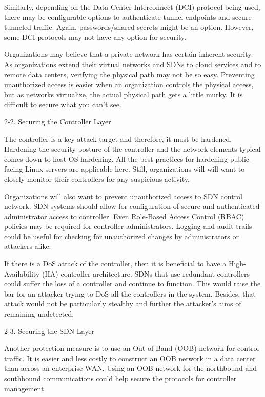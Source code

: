 Similarly, depending on the Data Center Interconnect (DCI) protocol being used, there may be configurable options to authenticate tunnel endpoints and secure tunneled traffic.  Again, passwords/shared-secrets might be an option.  However, some DCI protocols may not have any option for security.

Organizations may believe that a private network has certain inherent security.  As organizations extend their virtual networks and SDNs to cloud services and to remote data centers, verifying the physical path may not be so easy.  Preventing unauthorized access is easier when an organization controls the physical access, but as networks virtualize, the actual physical path gets a little murky.  It is difficult to secure what you can’t see.

2-2. Securing the Controller Layer

The controller is a key attack target and therefore, it must be hardened.  Hardening the security posture of the controller and the network elements typical comes down to host OS hardening.  All the best practices for hardening public-facing Linux servers are applicable here.  Still, organizations will will want to closely monitor their controllers for any suspicious activity.

Organizations will also want to prevent unauthorized access to SDN control network.  SDN systems should allow for configuration of secure and authenticated administrator access to controller.  Even Role-Based Access Control (RBAC) policies may be required for controller administrators.  Logging and audit trails could be useful for checking for unauthorized changes by administrators or attackers alike.

If there is a DoS attack of the controller, then it is beneficial to have a High-Availability (HA) controller architecture.  SDNs that use redundant controllers could suffer the loss of a controller and continue to function.  This would raise the bar for an attacker trying to DoS all the controllers in the system.  Besides, that attack would not be particularly stealthy and further the attacker’s aims of remaining undetected.

2-3. Securing the SDN Layer

Another protection measure is to use an Out-of-Band (OOB) network for control traffic.  It is easier and less costly to construct an OOB network in a data center than across an enterprise WAN.  Using an OOB network for the northbound and southbound communications could help secure the protocols for controller management.

